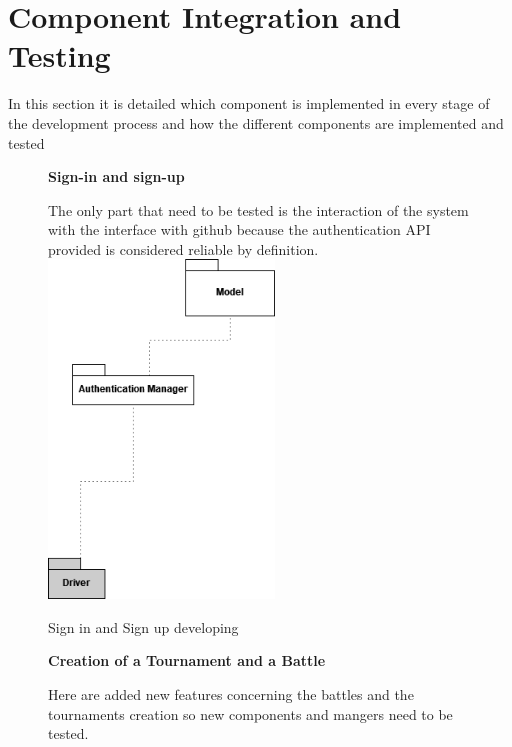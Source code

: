 \section{Component Integration and Testing}
In this section it is detailed which component is implemented in every stage of the development process and how the different components are implemented and tested

\begin{enumerate}[label={[\textbf{F\arabic*}]}]

\begin{figure}[!h]
    \item \textbf{Sign-in and sign-up}

    The only part that need to be tested is the interaction of the system with the interface with github because the authentication API provided is considered reliable by definition.  
        \centering
        \includegraphics[width=6cm]{Images/testing.drawio(1).png}
        \caption{Sign in and Sign up developing}
        \label{fig: Sign in and Sign up developing}
       
    \end{figure}







\begin{figure}[!h]
\item \textbf{Creation of a Tournament and a Battle}

Here are added new features concerning the battles and the tournaments creation so new components and mangers need to be tested.



\end{figure}
\end{enumerate}
